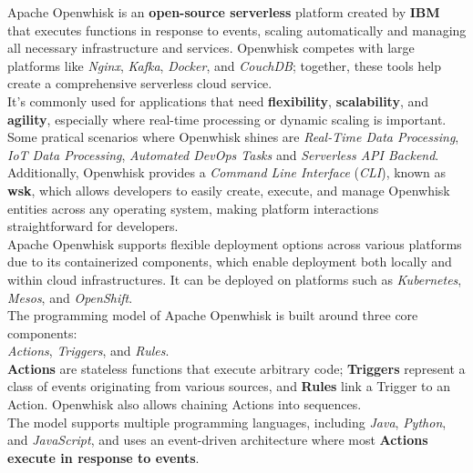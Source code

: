 Apache Openwhisk is an \textbf{open-source serverless} platform created by \textbf{IBM} that executes functions in response to events, scaling automatically and managing all necessary infrastructure and services. Openwhisk competes with large platforms like \textit{Nginx}, \textit{Kafka}, \textit{Docker}, and \textit{CouchDB}; together, these tools help create a comprehensive serverless cloud service.\vspace{14pt}\\
It’s commonly used for applications that need \textbf{flexibility}, \textbf{scalability}, and \textbf{agility}, especially where real-time processing or dynamic scaling is important. Some pratical scenarios where Openwhisk shines are \textit{Real-Time Data Processing}, \textit{IoT Data Processing}, \textit{Automated DevOps Tasks} and \textit{Serverless API Backend}.\vspace{14pt}\\
Additionally, Openwhisk provides a \textit{Command Line Interface} (\textit{CLI}), known as \textbf{wsk}, which allows developers to easily create, execute, and manage Openwhisk entities across any operating system, making platform interactions straightforward for developers.\vspace{14pt}\\
Apache Openwhisk supports flexible deployment options across various platforms due to its containerized components, which enable deployment both locally and within cloud infrastructures. It can be deployed on platforms such as \textit{Kubernetes}, \textit{Mesos}, and \textit{OpenShift}.\vspace{14pt}\\
The programming model of Apache Openwhisk is built around three core components:\\
\textit{Actions}, \textit{Triggers}, and \textit{Rules}.\vspace{14pt}\\
\textbf{Actions} are stateless functions that execute arbitrary code; \textbf{Triggers} represent a class of events originating from various sources, and \textbf{Rules} link a Trigger to an Action. Openwhisk also allows chaining Actions into sequences.\vspace{14pt}\\
The model supports multiple programming languages, including \textit{Java}, \textit{Python}, and \textit{JavaScript}, and uses an event-driven architecture where most \textbf{Actions execute in response to events}.\cite{quevedo2019evaluating}\vspace{10pt}
